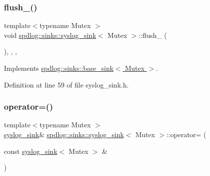 \subsubsection{\texorpdfstring{flush\+\_\+()}{flush\_()}}
{\footnotesize\ttfamily template$<$typename Mutex $>$ \\
void \hyperlink{classspdlog_1_1sinks_1_1syslog__sink}{spdlog\+::sinks\+::syslog\+\_\+sink}$<$ Mutex $>$\+::flush\+\_\+ (\begin{DoxyParamCaption}{ }\end{DoxyParamCaption})\hspace{0.3cm}{\ttfamily [inline]}, {\ttfamily [override]}, {\ttfamily [protected]}, {\ttfamily [virtual]}}



Implements \hyperlink{classspdlog_1_1sinks_1_1base__sink_a5ac2b237c60f68a18122a1ca09b812b4}{spdlog\+::sinks\+::base\+\_\+sink$<$ Mutex $>$}.



Definition at line 59 of file syslog\+\_\+sink.\+h.

\mbox{\label{classspdlog_1_1sinks_1_1syslog__sink_a3e2454370f91c3fe2befb3f24e25ede7}} 
\subsubsection{\texorpdfstring{operator=()}{operator=()}}
{\footnotesize\ttfamily template$<$typename Mutex $>$ \\
\hyperlink{classspdlog_1_1sinks_1_1syslog__sink}{syslog\+\_\+sink}\& \hyperlink{classspdlog_1_1sinks_1_1syslog__sink}{spdlog\+::sinks\+::syslog\+\_\+sink}$<$ Mutex $>$\+::operator= (\begin{DoxyParamCaption}\item[{const \hyperlink{classspdlog_1_1sinks_1_1syslog__sink}{syslog\+\_\+sink}$<$ Mutex $>$ \&}]{ }\end{DoxyParamCaption})\hspace{0.3cm}{\ttfamily [delete]}}

